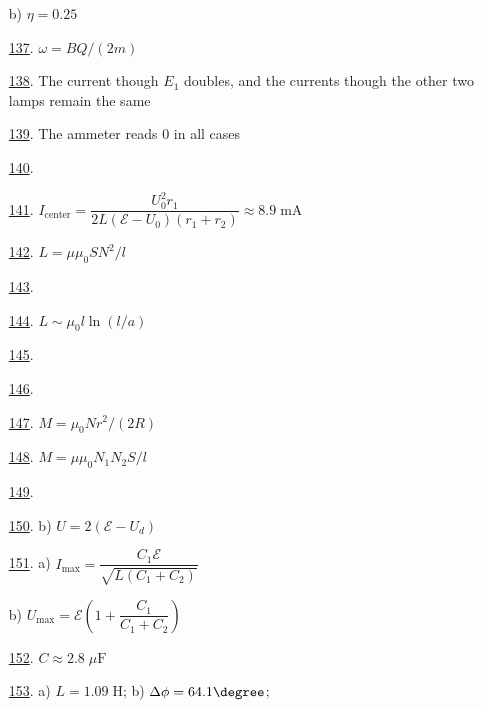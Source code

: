 \begin{multicols}{2}
\begin{enumerate}
	b) $\eta=0.25$ %
	\item [\hyperlink{P137}{137}.] $\omega=BQ/(2m)$ %
	\item [\hyperlink{P138}{138}.] The current though $E_1$ doubles, and the currents though the other two lamps remain the same %
	\item [\hyperlink{P139}{139}.] The ammeter reads 0 in all cases %
	\item [\hyperlink{P140}{140}.]  %
	\item [\hyperlink{P141}{141}.] $I_\text{center}=\dfrac{U_0^2r_1}{2L(\mathcal{E}-U_0)(r_1+r_2)}\approx8.9\;\text{mA}$ %
	\item [\hyperlink{P142}{142}.] $L=\mu\mu_0SN^2/l$ %
	\item [\hyperlink{P143}{143}.]  %
	\item [\hyperlink{P144}{144}.] $L\sim\mu_0l\ln(l/a)$ %
	\item [\hyperlink{P145}{145}.]  %
	\item [\hyperlink{P146}{146}.]  %
	\item [\hyperlink{P147}{147}.] $M=\mu_0Nr^2/(2R)$ %
	\item [\hyperlink{P148}{148}.] $M=\mu\mu_0N_1N_2S/l$ %
	\item [\hyperlink{P149}{149}.]  %
	\item [\hyperlink{P150}{150}.] b) $U=2(\mathcal{E}-U_d)$ %
	\item [\hyperlink{P151}{151}.] a) $I_\text{max}=\dfrac{C_1\mathcal{E}}{\sqrt{L(C_1+C_2)}}$
	
	b) $U_\text{max}=\mathcal{E}\left(1+\dfrac{C_1}{C_1+C_2}\right)$ %
	\item [\hyperlink{P152}{152}.] $C\approx2.8\;\mu\text{F}$ %
	\item [\hyperlink{P153}{153}.] a) $L=1.09\;\text{H}$; b) $\Delta\phi=64.1\degree$;
	

\end{enumerate}
\end{multicols}
